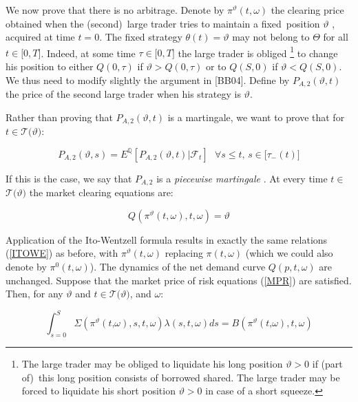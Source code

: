 \documentclass{article}
\begin{document}
We now prove that there is no arbitrage. Denote by $\pi ^{\vartheta
}(t,\omega )$ the clearing price obtained when the (second)\ large trader
tries to maintain a fixed\ position $\vartheta $ , acquired at time $t=0$.
The fixed strategy $\theta (t)=\vartheta $ may not belong to $\Theta $ for
all $t\in \lbrack 0,T]$. Indeed, at some time $\tau \in \lbrack 0,T]$ the
large trader is obliged \footnote{%
The large trader may be obliged to liquidate his long position $\vartheta >0$
if (part of)\ this long position consists of borrowed shared. The large
trader may be forced to liquidate his short position $\vartheta >0$ in case
of a short squeeze.} to change his position to either $Q(0,\tau )$ if $%
\vartheta >Q(0,\tau )$ or to $Q(S,0)$ if $\vartheta <Q(S,0)$. We thus need
to modify slightly the argument in [BB04]. Define by $P_{A,2}(\vartheta ,t)$
the price of the second large trader when his strategy is $\vartheta $.

Rather than proving that $P_{A,2}(\vartheta ,t)$ is a martingale, we want to
prove that for $t\in \mathcal{T(}\vartheta )$:

\begin{equation*}
P_{A,2}(\vartheta ,s)=E^{\mathbb{Q}}[P_{A,2}(\vartheta ,t)|\mathcal{F}_{t}]%
\text{ \ \ }\forall s\leq t\text{, }s\in \lbrack \tau _{-}(t)]
\end{equation*}

If this is the case, we say that $P_{A,2}$ is a \textit{piecewise martingale}%
. At every time $t\in $ $\mathcal{T(}\vartheta )$ the market clearing
equations are:

\begin{equation*}
Q(\pi ^{\vartheta }(t,\omega ),t,\omega )=\vartheta
\end{equation*}

Application of the Ito-Wentzell formula results in exactly the same
relations (\ref{ITOWE}) as before, with $\pi ^{\vartheta }(t,\omega )$
replacing $\pi (t,\omega )$ (which we could also denote by $\pi
^{0}(t,\omega )$). The dynamics of the net demand curve $Q(p,t,\omega )$ are
unchanged. Suppose that the market price of risk equations (\ref{MPR}) are
satisfied. Then, for any $\vartheta $ and $t\in \mathcal{T(}\vartheta )$,
and $\omega $:

\begin{equation*}
\int_{s=0}^{S}\Sigma (\pi ^{\vartheta }(t\text{,}\omega ),s,t,\omega
)\lambda (s,t,\omega )ds=B(\pi ^{\vartheta }(t\text{,}\omega ),t,\omega )
\end{equation*}
\end{document}
